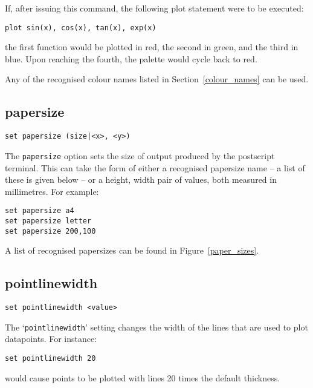 \documentclass[a4paper,onecolumn,11pt]{book}
\begin{document}
If, after issuing this command, the following plot statement were to be
executed:

\begin{verbatim}
plot sin(x), cos(x), tan(x), exp(x)
\end{verbatim}

\noindent the first function would be plotted in red, the second in green, and the third
in blue. Upon reaching the fourth, the palette would cycle back to red.

Any of the recognised colour names listed in Section~\ref{colour_names} can be used.

\subsection{papersize}

\begin{verbatim}
set papersize (size|<x>, <y>)
\end{verbatim}

The {\tt papersize} option sets the size of output produced by the postscript
terminal. This can take the form of either a recognised papersize name -- a
list of these is given below -- or a height, width pair of values, both measured
in millimetres. For example:

\begin{verbatim}
set papersize a4
set papersize letter
set papersize 200,100
\end{verbatim}

A list of recognised papersizes can be found in Figure~\ref{paper_sizes}.

\subsection{pointlinewidth}

\begin{verbatim}
set pointlinewidth <value>
\end{verbatim}

The `{\tt pointlinewidth}' setting changes the width of the lines that are used to
plot datapoints.  For instance:

\begin{verbatim}
set pointlinewidth 20
\end{verbatim}

\noindent would cause points to be plotted with lines 20 times the default thickness.
\end{document}
